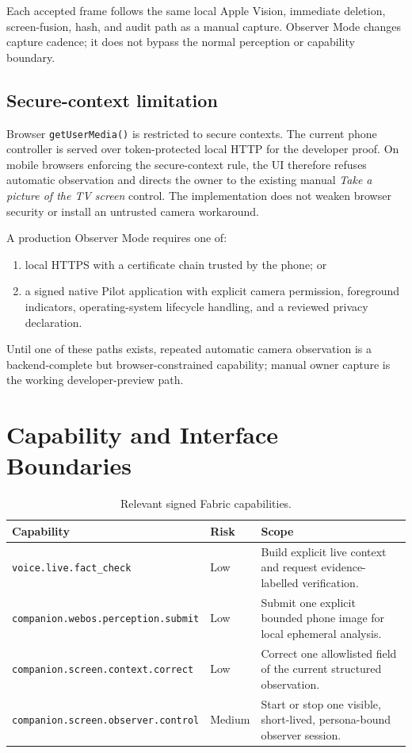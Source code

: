 \documentclass[11pt,a4paper]{article}
\begin{document}
Each accepted frame follows the same local Apple Vision, immediate deletion,
screen-fusion, hash, and audit path as a manual capture.  Observer Mode changes
capture cadence; it does not bypass the normal perception or capability
boundary.

\subsection{Secure-context limitation}

Browser \texttt{getUserMedia()} is restricted to secure contexts.\cite{mdnmedia}
The current phone controller is served over token-protected local HTTP for the
developer proof.  On mobile browsers enforcing the secure-context rule, the UI
therefore refuses automatic observation and directs the owner to the existing
manual \emph{Take a picture of the TV screen} control.  The implementation does
not weaken browser security or install an untrusted camera workaround.

A production Observer Mode requires one of:

\begin{enumerate}[leftmargin=*]
  \item local HTTPS with a certificate chain trusted by the phone; or
  \item a signed native Pilot application with explicit camera permission,
        foreground indicators, operating-system lifecycle handling, and a
        reviewed privacy declaration.
\end{enumerate}

Until one of these paths exists, repeated automatic camera observation is a
backend-complete but browser-constrained capability; manual owner capture is
the working developer-preview path.

\section{Capability and Interface Boundaries}

\begin{table}[htbp]
\centering
\small
\caption{Relevant signed Fabric capabilities.}
\begin{tabularx}{\textwidth}{@{}L{58mm}L{14mm}Y@{}}
\toprule
Capability & Risk & Scope\\
\midrule
\nolinkurl{voice.live.fact_check} & Low & Build explicit live context and request
evidence-labelled verification.\\
\nolinkurl{companion.webos.perception.submit} & Low & Submit one explicit bounded
phone image for local ephemeral analysis.\\
\nolinkurl{companion.screen.context.correct} & Low & Correct one allowlisted field
of the current structured observation.\\
\nolinkurl{companion.screen.observer.control} & Medium & Start or stop one visible,
short-lived, persona-bound observer session.\\
\bottomrule
\end{tabularx}
\end{table}
\end{document}
